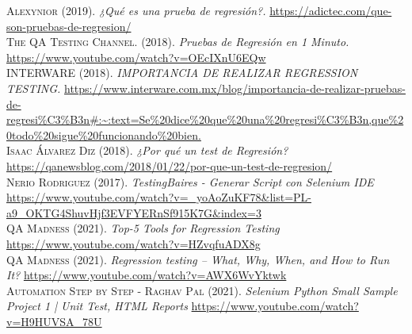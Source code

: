 \documentclass[conference]{IEEEtran}
\begin{document}
\begin{thebibliography}{}
 \textsc{Alexynior} (2019). \textit{¿Qué es una prueba de regresión?.} \url{https://adictec.com/que-son-pruebas-de-regresion/}\\

 \textsc{The QA Testing Channel.} (2018). \textit{Pruebas de Regresión en 1 Minuto.} \url{https://www.youtube.com/watch?v=OEcIXnU6EQw} \\


 \textsc{INTERWARE} (2018). \textit{IMPORTANCIA DE REALIZAR REGRESSION TESTING.} \url{https://www.interware.com.mx/blog/importancia-de-realizar-pruebas-de-regresi\%C3\%B3n\#:\~:text=Se\%20dice\%20que\%20una\%20regresi\%C3\%B3n,que\%20todo\%20sigue\%20funcionando\%20bien.} \\

 \textsc{Isaac Álvarez Diz} (2018). \textit{¿Por qué un test de Regresión?} \url{https://qanewsblog.com/2018/01/22/por-que-un-test-de-regresion/} \\


 \textsc{Nerio Rodriguez} (2017). \textit{TestingBaires - Generar Script con Selenium IDE} \url{https://www.youtube.com/watch?v=_yoAoZuKF78&list=PL-a9_OKTG4ShuvHjf3EVFYERnSf915K7G&index=3} \\

 \textsc{QA Madness} (2021). \textit{Top-5 Tools for Regression Testing} \url{https://www.youtube.com/watch?v=HZvqfuADX8g} \\

 \textsc{QA Madness} (2021). \textit{Regression testing – What, Why, When, and How to Run It?} \url{https://www.youtube.com/watch?v=AWX6WvYktwk} \\

 \textsc{Automation Step by Step - Raghav Pal} (2021). \textit{Selenium Python Small Sample Project 1 | Unit Test, HTML Reports} \url{https://www.youtube.com/watch?v=H9HUVSA_78U} \\


\end{thebibliography}
\end{document}

